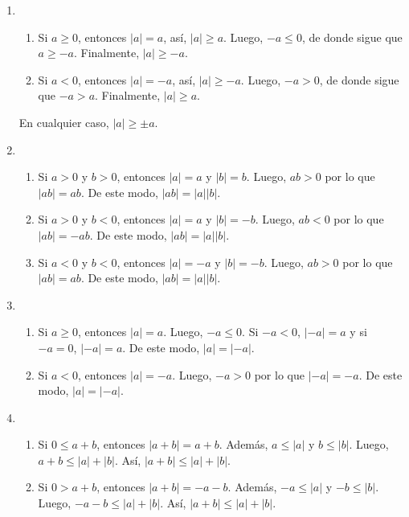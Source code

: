 \documentclass[11pt]{article}
\begin{document}
\begin{enumerate}[label=\alph*)]


    \item
        \begin{enumerate}[label=\roman*)]
            \item Si $a \geq 0$, entonces $|a|=a$, así, $|a| \geq a$. Luego, $-a \leq 0$, de donde sigue que $a \geq -a$. Finalmente, $|a| \geq -a$.
            \item Si $a<0$, entonces $|a|=-a$, así, $|a| \geq -a$. Luego, $-a>0$, de donde sigue que $-a>a$. Finalmente, $|a| \geq a$.
        \end{enumerate}
        En cualquier caso, $|a| \geq \pm a$.


    \item 
        \begin{enumerate}[label=\roman*)]
            \item Si $a>0$ y $b>0$, entonces $|a|=a$ y $|b|=b$. Luego, $ab>0$ por lo que $|ab|=ab$. De este modo, $|ab| =|a||b|$.
            \item Si $a>0$ y $b<0$, entonces $|a|=a$ y $|b|=-b$. Luego, $ab<0$ por lo que $|ab|=-ab$. De este modo, $|  ab|=|a||b|$.
            \item Si $a<0$ y $b<0$, entonces $|a|=-a$ y $|b|=-b$. Luego, $ab>0$ por lo que $|ab|=ab$. De este modo, $|  ab|=|a||b|$.
        \end{enumerate}


    \item 
        \begin{enumerate}[label=\roman*)]
            \item Si $a \geq 0$, entonces $|a|=a$. Luego, $-a \leq 0$. Si $-a<0$, $|-a|=a$ y si $-a=0$, $|-a|=a$. De este modo, $|a|=|-a|$.
            \item Si $a<0$, entonces $|a|=-a$. Luego, $-a>0$ por lo que $|-a|=-a$. De este modo, $|a|=|-a|$.
        \end{enumerate}

    
    \item 
        \begin{enumerate}[label=\roman*)]
            \item Si $0 \leq a+b$, entonces $|a+b|=a+b$. Además, $a \leq |a|$ y $b \leq |b|$. Luego, $a+b \leq |a|+|b|$. Así, $|a+b| \leq |a|+|b|$.
            \item Si $0 > a+b$, entonces $|a+b|=-a-b$. Además, $-a \leq |a|$ y $-b \leq |b|$. Luego, $-a-b \leq |a|+|b|$. Así, $|a+b| \leq |a|+|b|$.
        \end{enumerate}
    

\end{enumerate}
\end{document}
